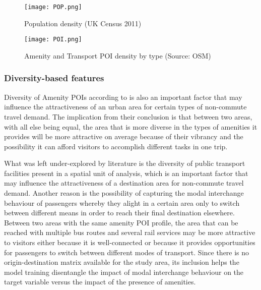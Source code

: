 \begin{figure}
    \centering
    \texttt{[image: POP.png]}
    \caption{Population density (UK Census 2011)}
    \label{fig:pop}
\end{figure}

\begin{figure}
    \centering
    \texttt{[image: POI.png]}
    \caption{Amenity and Transport POI density by type (Source: OSM)}
    \label{fig:poi}
\end{figure}

\subsubsection*{Diversity-based features}

Diversity of Amenity POIs according to \citet{cerveroTravelDemand3Ds1997} is also an important factor that may influence the attractiveness of an urban area for certain types of non-commute travel demand. The implication from their conclusion is that between two areas, with all else being equal, the area that is more diverse in the types of amenities it provides will be more attractive on average because of their vibrancy and the possibility it can afford visitors to accomplish different tasks in one trip.

What was left under-explored by literature is the diversity of public transport facilities present in a spatial unit of analysis, which is an important factor that may influence the attractiveness of a destination area for non-commute travel demand. Another reason is the possibility of capturing the modal interchange behaviour of passengers whereby they alight in a certain area only to switch between different means in order to reach their final destination elsewhere. Between two areas with the same amenity POI profile, the area that can be reached with multiple bus routes and several rail services may be more attractive to visitors either because it is well-connected or because it provides opportunities for passengers to switch between different modes of transport. Since there is no origin-destination matrix available for the study area, its inclusion helps the model training disentangle the impact of modal interchange behaviour on the target variable versus the impact of the presence of amenities. 

